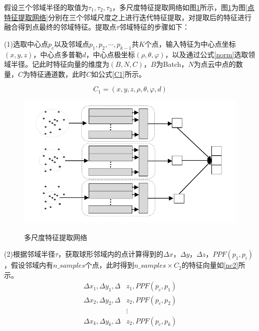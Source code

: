 假设三个邻域半径的取值为$\tau_1, \tau_2, \tau_3$，多尺度特征提取网络如图\ref{多尺度特征提取网络}所示，图\ref{多尺度特征提取网络}为图\ref{点特征提取网络}分别在三个邻域尺度之上进行迭代特征提取，对提取后的特征进行融合得到点最终的邻域特征。提取点$\tau$邻域特征的步骤如下：
\par 

(1)选取中心点$p_c$以及邻域点$p_1, p_2, \cdots, p_{k-1}$共$K$个点，输入特征为中心点坐标$(x,y,z)$，中心点多普勒$d$，中心点极坐标$(\rho, \theta, \varphi)$，以及通过公式\eqref{norm}选取领域半径。记此时特征向量的维度为$(B,N,C)$，$B$为Batch，$N$为点云中点的数量，$C$为特征通道数，此时$C$如公式\eqref{C1}所示。

\begin{equation}
	\label{C1}
	C_1 = (x,y,z,\rho,\theta,\varphi,d)
\end{equation}
\begin{figure}[htbp]
	\centering
	\includegraphics{figures/多尺度特征提取.pdf}\\
	\caption{多尺度特征提取网络}
	\label{多尺度特征提取网络}
\end{figure}

(2)根据邻域半径$\tau$，获取球形邻域内的点计算得到的$\Delta x$，$\Delta y$，$\Delta z$，$PPF(p_1, p_i)$，假设邻域内有$n\_samples$个点，此时得到$n\_samples\times C_2$的特征向量如\eqref{nc2}所示。
\begin{equation}
	\label{nc2}
	\begin{aligned}
		\Delta x_1, \Delta y_1, \Delta &z_1, PPF(p_c, p_1)\\
		\Delta x_2, \Delta y_2, \Delta &z_2, PPF(p_c, p_2)\\
		&\vdots \\
		\Delta x_k, \Delta y_k, \Delta &z_2, PPF(p_c, p_k)
	\end{aligned}
\end{equation}

